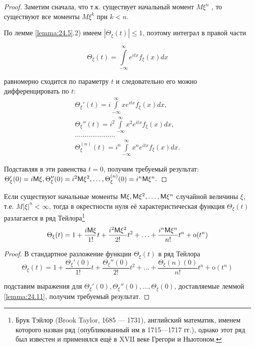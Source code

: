 \begin{proof}
Заметим сначала, что т.к. существует начальный момент
$M\xi^n$ , то существуют все моменты $M\xi^k$ при $k < n$.

По лемме \ref{lemma:24.5}.2) имеем $|\Theta_{\xi} (t)| \leq 1$, поэтому интеграл в правой части 

$$\Theta_{\xi} (t) = \int\limits_{-\infty}^{\infty} e^{itx}f_{\xi}(x)dx$$

равномерно сходится по параметру $t$ и следовательно его можно дифференцировать по $t$:
\begin{gather*}
	\Theta_{\xi}' (t) = i \int\limits_{-\infty}^{\infty} xe^{itx} f_{\xi}(x)dx,\\
	\Theta_{\xi}'' (t) = i^2 \int\limits_{-\infty}^{\infty} x^2 e^{itx} f_{\xi}(x)dx,\\
	\ldots\ldots\ldots\ldots\ldots\ldots\ldots\\
	\Theta_{\xi}^(n) (t) = i^n \int\limits_{-\infty}^{\infty} x^n e^{itx} f_{\xi}(x)dx.
\end{gather*}

Подставляя в эти равенства $t = 0$, получим требуемый результат: 
$\Theta_{\xi}' (0) = i\mathsf{M} \xi, \Theta_{\xi}'' (0) = i^2 \mathsf{M} \xi^2 , \ldots , \Theta_{\xi}^{(n)} (0) = i^n \mathsf{M} \xi^n .$
\end{proof}

\begin{lemma}
\label{lemma:24.12}
Если существуют начальные моменты $\mathsf{M} \xi, \mathsf{M} \xi^2 , \ldots , \mathsf{M} \xi^n$ случайной величины $\xi$, т.е. $M |\xi|^n < \infty$, тогда в окрестности нуля её
характеристическая функция $\Theta_{\xi} (t)$ разлагается в ряд Тейлора\footnote{
Брук Тэйлор (Brook Taylor, 1685 — 1731), английский математик, именем которого назван ряд (опубликованный им в 1715—1717 гг.), однако этот ряд был известен и применялся ещё в XVII веке Грегори и Ньютоном.
}
$$\Theta_{\xi} (t) = 1 + \frac{i\mathsf{M} \xi}{1!}t + \frac{i^2 \mathsf{M} \xi^2}{2!}t^2 + \ldots + \frac{i^n \mathsf{M} \xi^n}{n!}t^n + \text{o}(t^n)$$
\end{lemma}

\begin{proof}
В стандартное разложение функции $\Theta_{\xi} (t)$ в ряд Тейлора
$$\Theta_{\xi} (t) = 1 + \frac{\Theta_{\xi}'(0)}{1!}t + \frac{\Theta_{\xi}''(0)}{2!}t^2 + \ldots + \frac{\Theta_{\xi}(n)(0)}{n!}t^n + \text{o}(t^n)$$ 

подставим выражения для $\Theta_{\xi}' (0), \Theta_{\xi}'' (0), \ldots , \Theta_{\xi} (0)$, доставляемые леммой \ref{lemma:24.11}, получим требуемый результат.
\end{proof}

